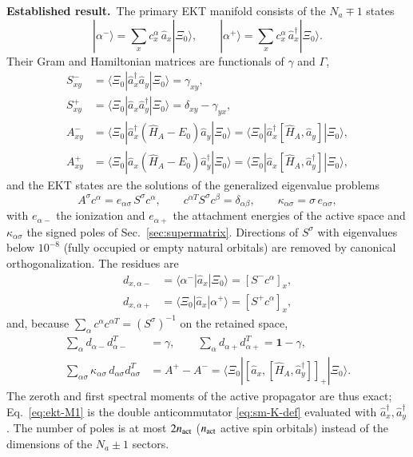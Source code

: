 \documentclass[aip,jcp,reprint,noshowkeys,superscriptaddress]{revtex4-1}
\newcommand{\Established}{\textbf{Established result.}\ }
\begin{document}
\Established The primary EKT manifold consists of the $N_a\mp1$ states
\begin{equation}
  |\alpha^-\rangle=\sum_xc^{\alpha}_x\,\hat a_x|\Xi_0\rangle,\qquad
  |\alpha^+\rangle=\sum_xc^{\alpha}_x\,\hat a_x^\dagger|\Xi_0\rangle .
  \label{eq:ekt-states}
\end{equation}
Their Gram and Hamiltonian matrices are functionals of $\gamma$ and
$\Gamma$,
\begin{align}
  S^{-}_{xy}&=\langle\Xi_0|\hat a_x^\dagger\hat a_y|\Xi_0\rangle=\gamma_{xy},
  \nonumber\\
  S^{+}_{xy}&=\langle\Xi_0|\hat a_x\hat a_y^\dagger|\Xi_0\rangle=\delta_{xy}-\gamma_{yx},
  \label{eq:ekt-metric}\\
  A^{-}_{xy}&=\langle\Xi_0|\hat a_x^\dagger(\hat H_A-E_0)\hat a_y|\Xi_0\rangle
  =\langle\Xi_0|\hat a_x^\dagger[\hat H_A,\hat a_y]|\Xi_0\rangle ,
  \nonumber\\
  A^{+}_{xy}&=\langle\Xi_0|\hat a_x(\hat H_A-E_0)\hat a_y^\dagger|\Xi_0\rangle
  =\langle\Xi_0|\hat a_x[\hat H_A,\hat a_y^\dagger]|\Xi_0\rangle ,
  \label{eq:ekt-A}
\end{align}
and the EKT states are the solutions of the generalized eigenvalue
problems
\begin{equation}
  A^{\sigma}c^{\alpha}=e_{\alpha\sigma}\,S^{\sigma}c^{\alpha},\qquad
  c^{\alpha T}S^{\sigma}c^{\beta}=\delta_{\alpha\beta},\qquad
  \kappa_{\alpha\sigma}=\sigma\,e_{\alpha\sigma},
  \label{eq:ekt-eig}
\end{equation}
with $e_{\alpha-}$ the ionization and $e_{\alpha+}$ the attachment energies
of the active space and $\kappa_{\alpha\sigma}$ the signed poles of
Sec.~\ref{sec:supermatrix}.  Directions of $S^{\sigma}$ with eigenvalues
below $10^{-8}$ (fully occupied or empty natural orbitals) are removed by
canonical orthogonalization.  The residues are
\begin{align}
  d_{x,\alpha-}&=\langle\alpha^-|\hat a_x|\Xi_0\rangle=[S^{-}c^{\alpha}]_x ,
  \nonumber\\
  d_{x,\alpha+}&=\langle\Xi_0|\hat a_x|\alpha^+\rangle=[S^{+}c^{\alpha}]_x ,
  \label{eq:ekt-d}
\end{align}
and, because $\sum_\alpha c^{\alpha}c^{\alpha T}=(S^{\sigma})^{-1}$ on the
retained space,
\begin{align}
  \sum_{\alpha}d_{\alpha-}d_{\alpha-}^{T}&=\gamma,\qquad
  \sum_{\alpha}d_{\alpha+}d_{\alpha+}^{T}=\mathbf 1-\gamma,
  \label{eq:ekt-M0}\\
  \sum_{\alpha\sigma}\kappa_{\alpha\sigma}\,d_{\alpha\sigma}d_{\alpha\sigma}^{T}
  &=A^{+}-A^{-}=\langle\Xi_0|[\hat a_x,[\hat H_A,\hat a_y^\dagger]]_+|\Xi_0\rangle .
  \label{eq:ekt-M1}
\end{align}
The zeroth and first spectral moments of the active propagator are thus
exact; Eq.~\eqref{eq:ekt-M1} is the double anticommutator
\eqref{eq:sm-K-def} evaluated with $\hat a_x^\dagger,\hat a_y^\dagger$.
The number of poles is at most $2n_{\rm act}$ ($n_{\rm act}$ active spin
orbitals) instead of the dimensions of the $N_a\pm1$ sectors.
\end{document}
